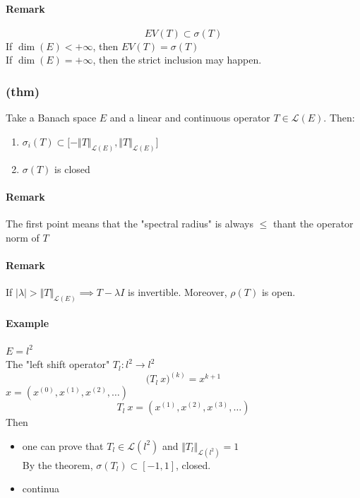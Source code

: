 \paragraph{Remark}
$$EV(T)\subset \sigma(T)$$
If $\dim(E)<+\infty$, then $EV(T)=\sigma(T)$\\
If $\dim(E)=+\infty$, then the strict inclusion may happen.
\subsubsection{(thm)}
Take a Banach space $E$ and a linear and continuous operator $T\in \mathcal L(E)$. Then:
\begin{enumerate}
    \item $\sigma_i(T)\subset \Big[-\Vert T\Vert_{\mathcal L(E)},\Vert T\Vert_{\mathcal L(E)}\Big]$
    \item $\sigma(T)$ is closed
\end{enumerate}
\paragraph{Remark}
The first point means that the "spectral radius" is always $\leq$ thant the operator norm of $T$
\paragraph{Remark}
If $|\lambda |>\Vert T\Vert_{\mathcal L(E)}\implies T-\lambda I$ is invertible. Moreover, $\rho(T)$ is open.
\paragraph{Example}
$E=l^2$\\
The "left shift operator" $T_l:l^2\to l^2$
$$\Big (T_l\ x\Big)^{(k)}=x^{k+1}$$
$x=(x^{(0)},x^{(1)},x^{(2)},\dots)$
$$T_l\ x=(x^{(1)},x^{(2)},x^{(3)},\dots)$$
Then 
\begin{itemize}
    \item one can prove that $T_l\in \mathcal L(l^2)$ and $\Vert T_l\Vert_{\mathcal L(l^2)}=1$\\
By the theorem, $\sigma (T_l)\subset [-1,1]$, closed.
\item continua
\end{itemize}

